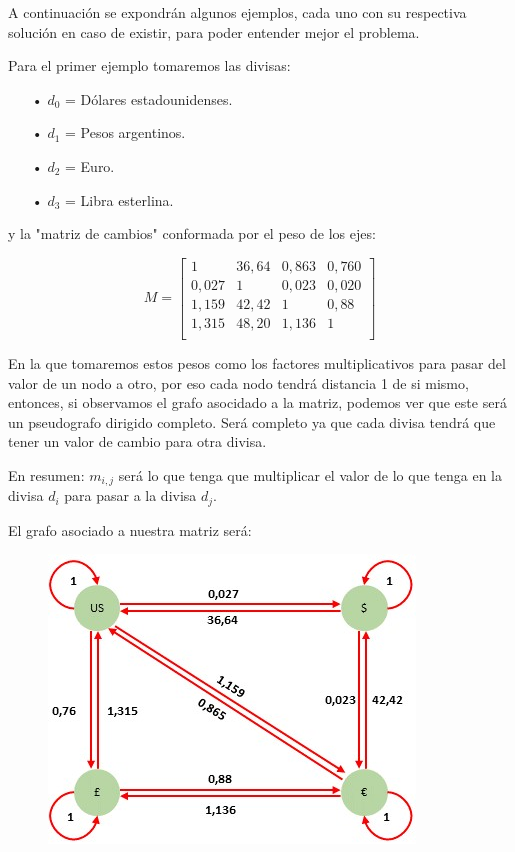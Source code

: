 \documentclass[11pt,a4paper]{article}
\begin{document}
A continuaci\'on se expondr\'an algunos ejemplos, cada uno con su respectiva soluci\'on en caso de existir, para poder entender mejor el problema.
\\


Para el primer ejemplo tomaremos las divisas:
\begin{itemize}
    \item[•] $d_{0}$ = D\'olares estadounidenses.
    \item[•] $d_{1}$ = Pesos argentinos.
    \item[•] $d_{2}$ = Euro.
    \item[•] $d_{3}$ = Libra esterlina.
\end{itemize}

y la "matriz de cambios" conformada por el peso de los ejes:

\[
M=
  \begin{bmatrix}
    1 & 36,64 & 0,863 & 0,760 \\
    0,027 & 1 & 0,023 & 0,020 \\
    1,159 & 42,42 & 1 & 0,88 \\
    1,315 & 48,20 & 1,136 & 1 \\
  \end{bmatrix}
\]

En la que tomaremos estos pesos como los factores multiplicativos para pasar del valor de un nodo a otro, por eso cada nodo tendr\'a distancia 1 de si mismo, entonces, si observamos el grafo asocidado a la matriz, podemos ver que este ser\'a un pseudografo dirigido completo. Ser\'a completo ya que cada divisa tendr\'a que tener un valor de cambio para otra divisa.

En resumen: $m_{i,j}$ ser\'a lo que tenga que multiplicar el valor de lo que tenga en la divisa $d_{i}$ para pasar a la divisa $d_{j}$.

El grafo asociado a nuestra matriz ser\'a:

\begin{figure}[h]
\centering 
\includegraphics{Grafoejemplo2.jpg}
\end{figure}
\end{document}
